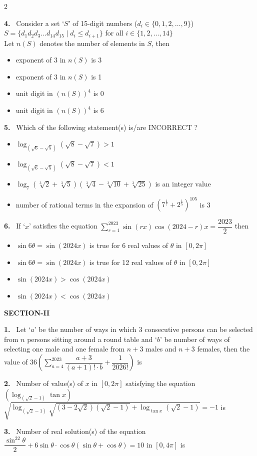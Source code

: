 \documentclass[10pt]{extarticle}
\newcommand{\sect}[1]{\par\smallskip\noindent\textbf{#1}\par}
\newcommand{\qn}[1]{\par\smallskip\noindent\textbf{#1.}~}
\newenvironment{qoptions}{\begin{itemize}[leftmargin=1.8em,itemsep=1pt,topsep=2pt,label={}]}{\end{itemize}}
\newcommand{\opt}[2]{\item[(#1)] #2}
\begin{document}
\begin{multicols}{2}
\qn{4} Consider a set `$S$' of 15-digit numbers ($d_i\in\{0,1,2,\ldots,9\}$)\\
$S=\{d_1d_2d_3\ldots d_{14}d_{15}\mid d_i\le d_{i+1}\}$ for all $i\in\{1,2,\ldots,14\}$\\
Let $n(S)$ denotes the number of elements in $S$, then
\begin{qoptions}
\opt{A}{exponent of 3 in $n(S)$ is 3}
\opt{B}{exponent of 3 in $n(S)$ is 1}
\opt{C}{unit digit in $(n(S))^4$ is 0}
\opt{D}{unit digit in $(n(S))^4$ is 6}
\end{qoptions}

\qn{5} Which of the following statement(s) is/are INCORRECT ?
\begin{qoptions}
\opt{A}{$\log_{(\sqrt6-\sqrt5)}\left(\sqrt8-\sqrt7\right)>1$}
\opt{B}{$\log_{(\sqrt6-\sqrt5)}\left(\sqrt8-\sqrt7\right)<1$}
\opt{C}{$\log_7\left(\sqrt[3]{2}+\sqrt[3]{5}\right)\left(\sqrt[3]{4}-\sqrt[3]{10}+\sqrt[3]{25}\right)$ is an integer value}
\opt{D}{number of rational terms in the expansion of $\left(7^{\frac17}+2^{\frac15}\right)^{105}$ is 3}
\end{qoptions}

\qn{6} If `$x$' satisfies the equation $\displaystyle\sum_{r=1}^{2023}\sin(rx)\cos(2024-r)x=\dfrac{2023}{2}$ then
\begin{qoptions}
\opt{A}{$\sin6\theta=\sin(2024x)$ is true for 6 real values of $\theta$ in $[0,2\pi]$}
\opt{B}{$\sin6\theta=\sin(2024x)$ is true for 12 real values of $\theta$ in $[0,2\pi]$}
\opt{C}{$\sin(2024x)>\cos(2024x)$}
\opt{D}{$\sin(2024x)<\cos(2024x)$}
\end{qoptions}

\sect{SECTION-II}
\qn{1} Let `$a$' be the number of ways in which 3 consecutive persons can be selected from $n$ persons sitting around a round table and `$b$' be number of ways of selecting one male and one female from $n+3$ males and $n+3$ females, then the value of $36\left(\displaystyle\sum_{a=4}^{2023}\dfrac{a+3}{(a+1)!\cdot b}+\dfrac{1}{2026!}\right)$ is

\qn{2} Number of value(s) of $x$ in $[0,2\pi]$ satisfying the equation\\
$\left(\log_{(\sqrt2-1)}\tan x\right)$\\
$\sqrt{\log_{(\sqrt2-1)}\sqrt{(3-2\sqrt2)\left(\sqrt2-1\right)}+\log_{\tan x}\left(\sqrt2-1\right)}=-1$ is

\qn{3} Number of real solution(s) of the equation $\dfrac{\sin^22\theta}{2}+6\sin\theta\cdot\cos\theta(\sin\theta+\cos\theta)=10$ in $[0,4\pi]$ is


\end{multicols}
\end{document}
